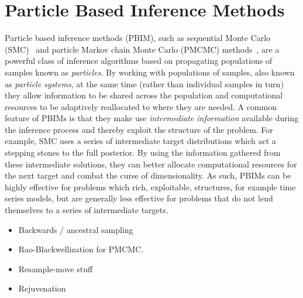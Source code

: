 
\chapter{Particle Based Inference Methods}
\label{sec:part}

Particle based inference methods (PBIM), such as sequential Monte Carlo (SMC)~\citep{gordon1993novel,doucet2001introduction} and 
particle Markov chain Monte Carlo (PMCMC) methods~\citep{andrieu2009pseudo,rainforth2016interacting},
are a powerful class of inference algorithms based on propagating populations of samples
known as \emph{particles}.  By working with populations of samples, also known as \emph{particle systems},
 at the same time (rather than individual
samples in turn) they allow information to be shared across the population and computational
resources to be adaptively reallocated to where they are needed.  A common feature of PBIMs is
that they make use \emph{intermediate information} available during the inference process and thereby
exploit the structure of the problem.  For example, SMC uses a series of intermediate target distributions
which act a stepping stones to the full posterior.  By using the information gathered from these intermediate
solutions, they can better allocate computational resources for the next target and combat the curse of
dimensionality.  As such, PBIMs can be highly effective for problems which rich, exploitable, structures, 
for example time series models, but are generally less effective for problems that do not lend themselves
to a series of intermediate targets.






\begin{itemize}
	\item Backwards / ancestral sampling
	\item Rao-Blackwellization for PMCMC.
	\item Resample-move stuff
	\item Rejuvenation
\end{itemize}